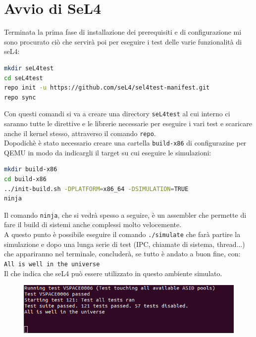 \section{Avvio di SeL4}
Terminata la prima fase di installazione dei prerequisiti e di configurazione mi sono procurato ciò che servirà poi per eseguire i test delle varie funzionalità di seL4:
\begin{lstlisting}[language=bash]
mkdir seL4test
cd seL4test
repo init -u https://github.com/seL4/sel4test-manifest.git
repo sync
\end{lstlisting}
Con questi comandi si va a creare una directory \texttt{seL4test} al cui interno ci saranno tutte le direttive e le librerie necessarie per eseguire i vari test e scaricare anche il kernel stesso, attraverso il comando \texttt{repo}.\\
Dopodichè è stato necessario creare una cartella \texttt{build-x86} di configurazine per QEMU in modo da indicargli il target su cui eseguire le simulazioni:
\begin{lstlisting}[language=bash]
mkdir build-x86
cd build-x86
../init-build.sh -DPLATFORM=x86_64 -DSIMULATION=TRUE
ninja
\end{lstlisting}
Il comando \texttt{ninja}, che si vedrà spesso a seguire, è un assembler che permette di fare il build di sistemi anche complessi molto velocemente.\\
A questo punto è possibile eseguire il comando \texttt{./simulate} che farà partire la simulazione e dopo una lunga serie di test (IPC, chiamate di sistema, thread...) che appariranno nel terminale, concluderà, se tutto è andato a buon fine, con:\\
\texttt{All is well in the universe}\\
Il che indica che seL4 può essere utilizzato in questo ambiente simulato.
\begin{figure}[H]
  \includegraphics[width=\linewidth]{img/PrimaSimulazione.png}
  \label{fig:Prima simulazione}
\end{figure}

